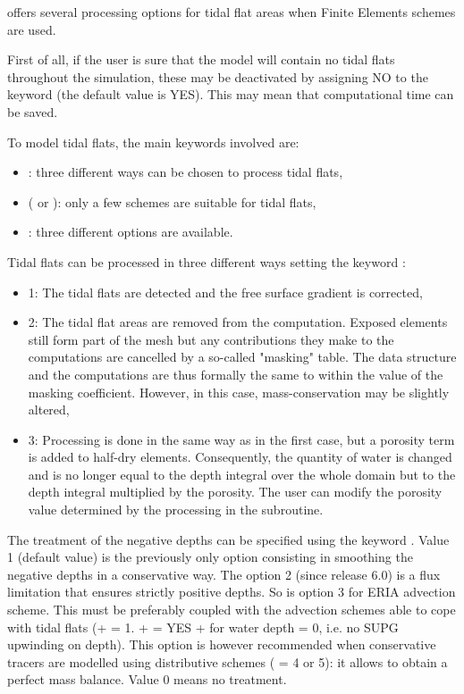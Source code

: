  offers several processing options for tidal flat areas
when Finite Elements schemes are used.

First of all, if the user is sure that the model will contain no tidal flats
throughout the simulation, these may be deactivated by assigning NO
to the keyword  (the default value is YES).
This may mean that computational time can be saved.

To model tidal flats, the main keywords involved are:
\begin{itemize}
\item {}:
three different ways can be chosen to process tidal flats,
\item {}
( or ):
only a few schemes are suitable for tidal flats,
\item {}: three different options are
available.
\end{itemize}

Tidal flats can be processed in three different ways setting the keyword
:

\begin{itemize}
\item 1: The tidal flats are detected and the free surface gradient
is corrected,

\item 2: The tidal flat areas are removed from the computation.
Exposed elements still form part of the mesh but any contributions they make
to the computations are cancelled by a so-called "masking" table.
The data structure and the computations are thus formally the same to
within the value of the masking coefficient.
However, in this case, mass-conservation may be slightly altered,

\item 3: Processing is done in the same way as in the first case,
but a porosity term is added to half-dry elements.
Consequently, the quantity of water is changed and is no longer equal
to the depth integral over the whole domain but to the depth integral
multiplied by the porosity.
The user can modify the porosity value determined by the processing in the
 subroutine.
\end{itemize}


The treatment of the negative depths can be specified using the keyword
.
Value 1 (default value) is the previously only option consisting in smoothing
the negative depths in a conservative way.
The option 2 (since release 6.0) is a flux limitation
that ensures strictly positive depths.
So is option 3 for ERIA advection scheme.
This must be preferably coupled with the advection schemes able to cope
with tidal flats (+  = 1.
+  = YES
+  for water depth = 0, i.e. no SUPG upwinding on depth).
This option is however recommended when conservative tracers are modelled
using distributive schemes ( = 4 or 5):
it allows to obtain a perfect mass balance. Value 0 means no treatment.

